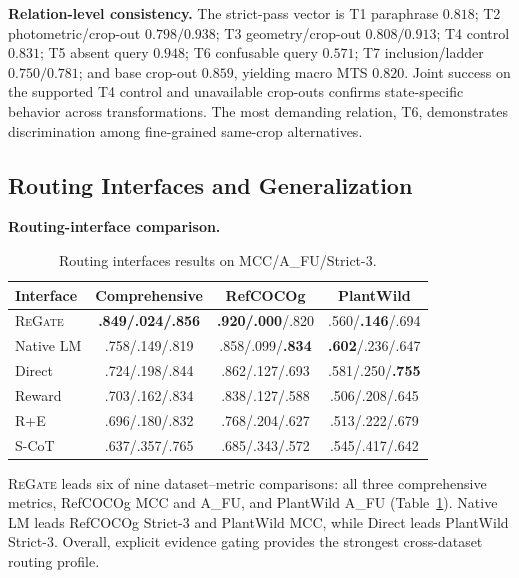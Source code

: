 \documentclass[letterpaper]{article}
\newcommand{\Method}{\textsc{ReGate}\xspace}
\begin{document}
\textbf{Relation-level consistency.}
The strict-pass vector is T1 paraphrase $0.818$; T2 photometric/crop-out $0.798/0.938$; T3 geometry/crop-out $0.808/0.913$; T4 control $0.831$; T5 absent query $0.948$; T6 confusable query $0.571$; T7 inclusion/ladder $0.750/0.781$; and base crop-out $0.859$, yielding macro MTS $0.820$. Joint success on the supported T4 control and unavailable crop-outs confirms state-specific behavior across transformations. The most demanding relation,  T6, demonstrates discrimination among fine-grained same-crop alternatives.%

\subsection{Routing Interfaces and Generalization}
\label{sec:plantwild}
\label{sec:gpt56_comparison}

\textbf{Routing-interface comparison.}

\begin{table}[t]
\centering
\small
\setlength{\tabcolsep}{1.5mm}
\begin{tabular*}{\columnwidth}{@{\extracolsep{\fill}}lccc@{}}
\toprule
Interface & Comprehensive & RefCOCOg & PlantWild \\
\midrule
\Method & \textbf{.849/.024/.856} & \textbf{.920/.000}/.820 & .560/\textbf{.146}/.694 \\
Native LM & .758/.149/.819 & .858/.099/\textbf{.834} & \textbf{.602}/.236/.647 \\
Direct & .724/.198/.844 & .862/.127/.693 & .581/.250/\textbf{.755} \\
Reward & .703/.162/.834 & .838/.127/.588 & .506/.208/.645 \\
R+E & .696/.180/.832 & .768/.204/.627 & .513/.222/.679 \\
S-CoT & .637/.357/.765 & .685/.343/.572 & .545/.417/.642 \\
\bottomrule
\end{tabular*}
\caption{Routing interfaces results on %
MCC/A\_FU/Strict-3.%
}
\label{tab:routing_interfaces}
\end{table}

\Method leads six of nine dataset--metric comparisons: all three comprehensive metrics, RefCOCOg MCC and A\_FU, and PlantWild A\_FU (Table~\ref{tab:routing_interfaces}). Native LM leads RefCOCOg Strict-3 and PlantWild MCC, while Direct leads PlantWild Strict-3. Overall, explicit evidence gating provides the strongest cross-dataset routing profile.
\end{document}
